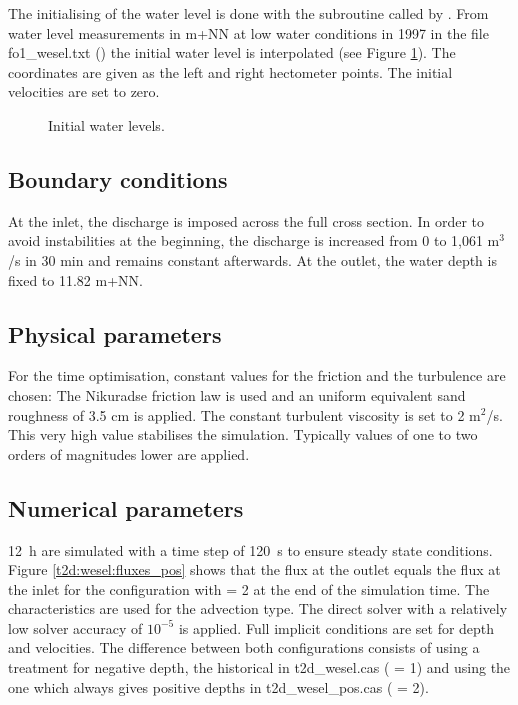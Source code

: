 The initialising of the water level is done with the subroutine
 called by .
From water level measurements in m+NN at low water conditions in 1997 in the
file fo1\_wesel.txt () the initial water level is
interpolated (see Figure \ref{t2d:wesel:free_surface0}).
The coordinates are given as the left and right hectometer points.
The initial velocities are set to zero.

\begin{figure} [h!]
\centering
{}
\caption{Initial water levels.}
\label{t2d:wesel:free_surface0}
\end{figure}

\subsection{Boundary conditions}

At the inlet, the discharge is imposed across the full cross section.
In order to avoid instabilities at the beginning, the discharge is increased from
0 to 1,061 m$^3$/s in 30 min and remains constant afterwards.
At the outlet, the water depth is fixed to 11.82 m+NN.


\subsection{Physical parameters}
For the time optimisation, constant values for the friction and the turbulence
are chosen:
The Nikuradse friction law is used and an uniform equivalent sand roughness of
3.5 cm is applied.
The constant turbulent viscosity is set to 2 m$^2$/s.
This very high value stabilises the simulation.
Typically values of one to two orders of magnitudes lower are applied.

\subsection{Numerical parameters}
12~h are simulated with a time step of 120~s to ensure steady state conditions.
Figure \ref{t2d:wesel:fluxes_pos} shows that the flux at the outlet equals the
flux at the inlet for the configuration with
 = 2 at the end of the simulation time.
The characteristics are used for the advection type.
The direct solver with a relatively low solver accuracy of $10^{-5}$ is applied.
Full implicit conditions are set for depth and velocities. 
The difference between both configurations consists of using a treatment for
negative depth, the historical in t2d\_wesel.cas
( = 1)
and using the one which always gives positive depths in t2d\_wesel\_pos.cas
( = 2).

